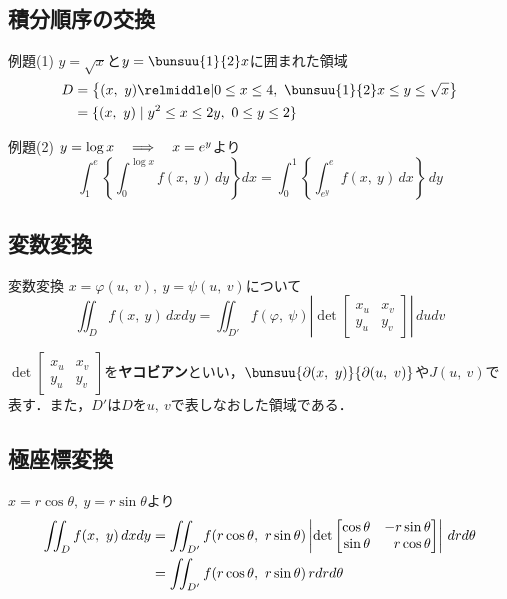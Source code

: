 \subsection{積分順序の交換}

\begin{tip}{例題(1)}
	$y = \sqrt{x}$と$y = \bunsuu{1}{2}x$に囲まれた領域
	\tcblower
	\begin{align*}
		D &= \left\{(x,\ y) \relmiddle| 0 \le x \le 4,\ \bunsuu{1}{2}x \le y \le \sqrt{x}\right\}\\
		&= \{(x,\ y) \mid y^2 \le x \le 2y,\ 0 \le y \le 2\}
	\end{align*}
\end{tip}

\begin{tip}{例題(2)}
	$y = \log x \quad\Longrightarrow\quad x = e^y$より
	\begin{equation*}
		\int_{1}^{e} \left\{\int_{0}^{\log x} f(x,\ y)\,dy\right\}dx = \int_{0}^{1} \left\{\int_{e^y}^{e} f(x,\ y)\,dx\right\}\,dy
	\end{equation*}
\end{tip}



\subsection{変数変換}

\begin{kousiki}{変数変換}
	$x = \varphi(u,\ v),\ y = \psi(u,\ v)$について
	\begin{equation}
		\iint_{D} f(x,\ y)\,dxdy = \iint_{D'} f(\varphi,\ \psi)\left|\det
			\begin{bmatrix}
				x_u & x_v\\ y_u & y_v
			\end{bmatrix}
		\right|\,dudv
	\end{equation}
\end{kousiki}

$\det\begin{bmatrix}
	x_u & x_v\\ y_u & y_v
\end{bmatrix}$を\textbf{ヤコビアン}といい，$\bunsuu{\partial(x,\ y)}{\partial(u,\ v)}$や$J(u,\ v)$で表す．また，$D'$は$D$を$u,\ v$で表しなおした領域である．



\subsection{極座標変換}

$x = r\cos\theta,\ y = r\sin\theta$より
\begin{align}
	\iint_{D} f(x,\ y)\,dxdy &= \iint_{D'} f(r\cos\theta,\ r\sin\theta) \left|\det
	\begin{bmatrix*}[r]
		\cos\theta & -r\sin\theta\\ \sin\theta & r\cos\theta
	\end{bmatrix*}
	\right|\,drd\theta \notag\\
	&= \iint_{D'} f(r\cos\theta,\ r\sin\theta)\,rdrd\theta
\end{align}

\newpage